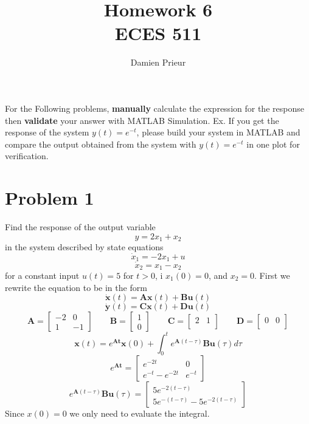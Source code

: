 \documentclass{article}
\author{Damien Prieur}
\title{Homework 6 \\ ECES 511}
\date{}
\begin{document}
\maketitle

\noindent
For the Following problems, \textbf{manually} calculate the expression for the response then \textbf{validate} your answer with MATLAB Simulation.
Ex. If you get the response of the system $y(t) = e^{-t}$, please build your system in MATLAB and compare the output obtained from the system with $y(t) = e^{-t}$ in one plot for verification.
\section*{Problem 1}
Find the response of the output variable
$$ y = 2x_1+x_2 $$
in the system described by state equations
$$ \dot{x}_1 = -2x_1 + u $$
$$ \dot{x}_2 = x_1 - x_2 $$
for a constant input $u(t)=5$ for $t>0$, i $x_1(0)=0$, and $x_2=0$.
\newline
\newline
First we rewrite the equation to be in the form
$$ \dot{\mathbf{x}}(t)= \mathbf{A}\mathbf{x}(t) + \mathbf{B}\mathbf{u}(t) $$
$$ \dot{\mathbf{y}}(t)= \mathbf{C}\mathbf{x}(t) + \mathbf{D}\mathbf{u}(t) $$
$$
\mathbf{A}
=
\begin{bmatrix}
-2 &  0 \\
 1 & -1
\end{bmatrix}
\qquad
\mathbf{B}
=
\begin{bmatrix}
 1  \\
 0
\end{bmatrix}
\qquad
\mathbf{C}
=
\begin{bmatrix}
 2 & 1 \\
\end{bmatrix}
\qquad
\mathbf{D}
=
\begin{bmatrix}
 0 & 0 \\
\end{bmatrix}
$$
$$
\mathbf{x}(t)
=
e^{\mathbf{At}}\mathbf{x}(0) + \int_0^t e^{\mathbf{A}(t-\tau)}\mathbf{B}\mathbf{u}(\tau) d\tau
$$
$$
e^{\mathbf{At}}
=
\begin{bmatrix}
e^{-2t} & 0 \\
e^{-t}-e^{-2t} & e^{-t}
\end{bmatrix}
$$
$$
e^{\mathbf{A}(t-\tau)}\mathbf{B}\mathbf{u}(\tau)
=
\begin{bmatrix}
5e^{-2(t-\tau)} \\
5e^{-(t-\tau)}-5e^{-2(t-\tau)}
\end{bmatrix}
$$
Since $x(0)=0$ we only need to evaluate the integral.
\end{document}
